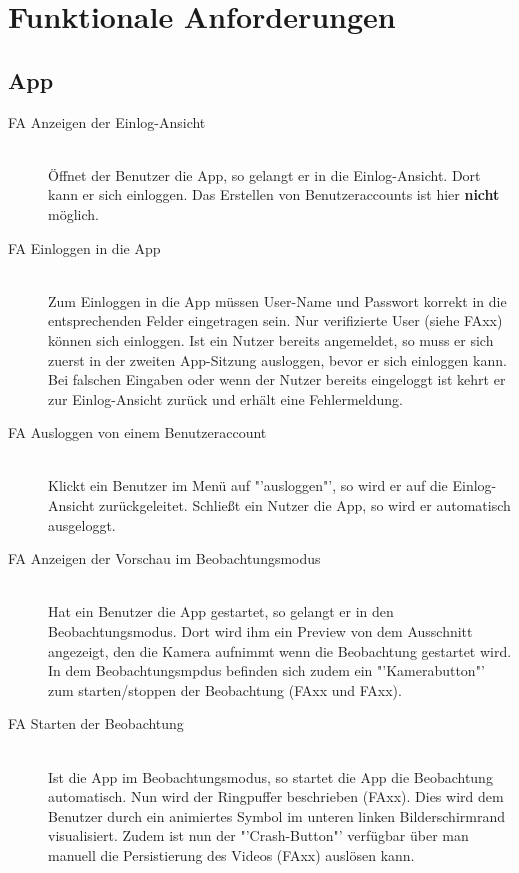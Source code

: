 \chapter{Funktionale Anforderungen}

\section{App}
\begin{description}
\item[FA Anzeigen der Einlog-Ansicht] \hfill \\
Öffnet der Benutzer die App, so gelangt er in die Einlog-Ansicht. Dort kann er sich einloggen. Das Erstellen von Benutzeraccounts ist hier \textbf{nicht} möglich.

\item[FA Einloggen in die App] \hfill \\
Zum Einloggen in die App müssen User-Name und Passwort korrekt in die entsprechenden Felder eingetragen sein. Nur verifizierte User (siehe FAxx) können sich einloggen. Ist ein Nutzer bereits angemeldet, so muss er sich zuerst in der zweiten App-Sitzung ausloggen, bevor er sich einloggen kann. Bei falschen Eingaben oder wenn der Nutzer bereits eingeloggt ist kehrt er zur Einlog-Ansicht zurück und erhält eine Fehlermeldung.

\item[FA Ausloggen von einem Benutzeraccount] \hfill \\
Klickt ein Benutzer im Menü auf "'ausloggen"', so wird er auf die Einlog-Ansicht zurückgeleitet. Schließt ein Nutzer die App, so wird er automatisch ausgeloggt.

\item[FA Anzeigen der Vorschau im Beobachtungsmodus] \hfill \\
Hat ein Benutzer die App gestartet, so gelangt er in den Beobachtungsmodus. Dort wird ihm ein Preview von dem Ausschnitt angezeigt, den die Kamera aufnimmt wenn die Beobachtung gestartet wird. In dem Beobachtungsmpdus befinden sich zudem ein "'Kamerabutton"' zum starten/stoppen der Beobachtung (FAxx und FAxx).

\item[FA Starten der Beobachtung] \hfill \\
Ist die App im Beobachtungsmodus, so startet die App die Beobachtung automatisch. Nun wird der Ringpuffer beschrieben (FAxx). Dies wird dem Benutzer durch ein animiertes Symbol im unteren linken Bilderschirmrand visualisiert. Zudem ist nun der "'Crash-Button"' verfügbar über man manuell die Persistierung des Videos (FAxx) auslösen kann.


\end{description}
